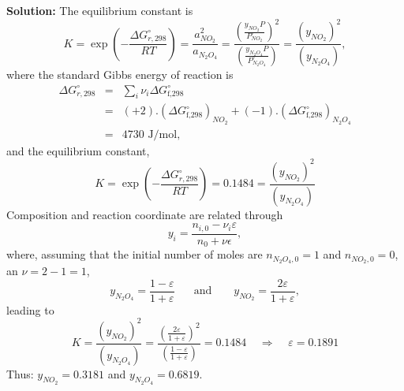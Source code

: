 \documentclass[12pts,a4paper,amsmath,amssymb,floatfix]{article}%
\newcommand{\frc}{\displaystyle\frac}
\newcounter{reaction}
\begin{document}
\begin{enumerate}[1)]
{\bf Solution:} 
       The equilibrium constant is
         \begin{displaymath}
             K = \exp\left(-\frc{\Delta G^{\circ}_{r,298}}{RT}\right) = \frc{a_{NO_{2}}^{2}}{a_{N_{2}O_{4}}} = \frc{\left(\frc{y_{NO_{2}}P}{P^{\circ}_{NO_{2}}}\right)^{2}}{\left(\frc{y_{N_{2}O_{4}}P}{P^{\circ}_{N_{2}O_{4}}}\right)} = \frac{\left(y_{NO_{2}}\right)^{2}}{\left(y_{N_{2}O_{4}}\right)},
         \end{displaymath}
         where the standard Gibbs energy of reaction is
         \begin{eqnarray}
           \Delta G^{\circ}_{r,298} &=& \sum\limits_{i}\nu_{i}\Delta G^{\circ}_{\text{f,298}} \nonumber \\
                             &=& (+2).\left(\Delta G^{\circ}_{\text{f,298}}\right)_{NO_{2}} + (-1).\left(\Delta G^{\circ}_{\text{f,298}}\right)_{N_{2}O_{4}} \nonumber \\ 
                             &=& 4730 \text{ J/mol}, \nonumber
         \end{eqnarray}
         and the equilibrium constant,
         \begin{displaymath}
             K = \exp\left(-\frc{\Delta G^{\circ}_{r,298}}{RT}\right) = 0.1484 = \frac{\left(y_{NO_{2}}\right)^{2}}{\left(y_{N_{2}O_{4}}\right)}
         \end{displaymath}
         Composition and reaction coordinate are related through
         \begin{displaymath}
            y_{i} = \frc{n_{i,0} - \nu_{i}\varepsilon}{n_{0}+\nu\epsilon},
         \end{displaymath}
         where, assuming that the initial number of moles are $n_{N_{2}O_{4},0}=1$ and $n_{NO_{2},0}=0$, an $\nu= 2-1 = 1$,
         \begin{displaymath}
            y_{N_{2}O_{4}} = \frc{1-\varepsilon}{1+\varepsilon}\;\;\;\;\;\text{ and }\;\;\;\;\;\; y_{NO_{2}} = \frc{2\varepsilon}{1+\varepsilon},
         \end{displaymath}
         leading to
         \begin{displaymath}
             K = \frac{\left(y_{NO_{2}}\right)^{2}}{\left(y_{N_{2}O_{4}}\right)} = \frc{\left(\frc{2\varepsilon}{1+\varepsilon}\right)^{2}}{\left(\frc{1-\varepsilon}{1+\varepsilon}\right)} = 0.1484 \;\;\;\;\Longrightarrow\;\;\;\; \varepsilon = 0.1891
         \end{displaymath}
         Thus: $y_{NO_{2}} = 0.3181$ and $y_{N_{2}O_{4}} = 0.6819$.


\end{enumerate}
\end{document}
